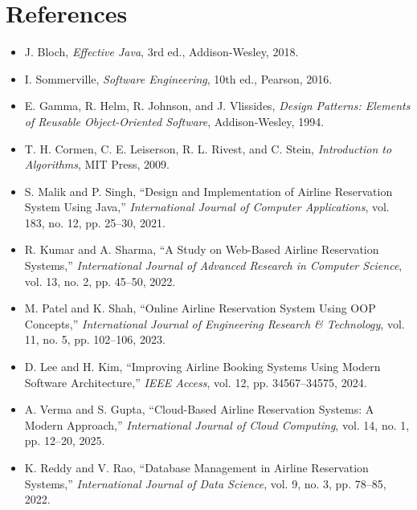 \chapter{References}

\begin{itemize}

\item J. Bloch, \textit{Effective Java}, 3rd ed., Addison-Wesley, 2018.

\item I. Sommerville, \textit{Software Engineering}, 10th ed., Pearson, 2016.

\item E. Gamma, R. Helm, R. Johnson, and J. Vlissides, \textit{Design Patterns: Elements of Reusable Object-Oriented Software}, Addison-Wesley, 1994.

\item T. H. Cormen, C. E. Leiserson, R. L. Rivest, and C. Stein, \textit{Introduction to Algorithms}, MIT Press, 2009.

\item S. Malik and P. Singh, “Design and Implementation of Airline Reservation System Using Java,” \textit{International Journal of Computer Applications}, vol. 183, no. 12, pp. 25–30, 2021.

\item R. Kumar and A. Sharma, “A Study on Web-Based Airline Reservation Systems,” \textit{International Journal of Advanced Research in Computer Science}, vol. 13, no. 2, pp. 45–50, 2022.

\item M. Patel and K. Shah, “Online Airline Reservation System Using OOP Concepts,” \textit{International Journal of Engineering Research \& Technology}, vol. 11, no. 5, pp. 102–106, 2023.

\item D. Lee and H. Kim, “Improving Airline Booking Systems Using Modern Software Architecture,” \textit{IEEE Access}, vol. 12, pp. 34567–34575, 2024.

\item A. Verma and S. Gupta, “Cloud-Based Airline Reservation Systems: A Modern Approach,” \textit{International Journal of Cloud Computing}, vol. 14, no. 1, pp. 12–20, 2025.

\item K. Reddy and V. Rao, “Database Management in Airline Reservation Systems,” \textit{International Journal of Data Science}, vol. 9, no. 3, pp. 78–85, 2022.


\end{itemize}
